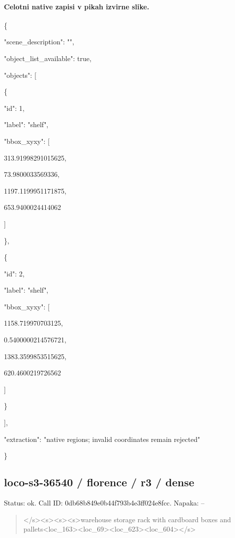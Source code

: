 \documentclass[10pt,a4paper]{article}
\begin{document}
\paragraph{Celotni native zapisi v pikah izvirne slike.}
\{\par
  "scene\_description":\allowbreak{} "",\allowbreak{}\par
  "object\_list\_available":\allowbreak{} true,\allowbreak{}\par
  "objects":\allowbreak{} [\par
    \{\par
      "id":\allowbreak{} 1,\allowbreak{}\par
      "label":\allowbreak{} "shelf",\allowbreak{}\par
      "bbox\_xyxy":\allowbreak{} [\par
        313.91998291015625,\allowbreak{}\par
        73.9800033569336,\allowbreak{}\par
        1197.1199951171875,\allowbreak{}\par
        653.9400024414062\par
      ]\par
    \},\allowbreak{}\par
    \{\par
      "id":\allowbreak{} 2,\allowbreak{}\par
      "label":\allowbreak{} "shelf",\allowbreak{}\par
      "bbox\_xyxy":\allowbreak{} [\par
        1158.719970703125,\allowbreak{}\par
        0.5400000214576721,\allowbreak{}\par
        1383.3599853515625,\allowbreak{}\par
        620.4600219726562\par
      ]\par
    \}\par
  ],\allowbreak{}\par
  "extraction":\allowbreak{} "native regions; invalid coordinates remain rejected"\par
\}
\subsection*{loco-s3-36540 / florence / r3 / dense}
Status: ok. Call ID: 0db68b849e0b44f793b4e3ff024e8fcc. Napaka: --
\begin{quote}\footnotesize
</s>\allowbreak{}<s>\allowbreak{}<s>\allowbreak{}<s>\allowbreak{}warehouse storage rack with cardboard boxes and pallets<loc\_163>\allowbreak{}<loc\_69>\allowbreak{}<loc\_623\allowbreak{}>\allowbreak{}<loc\_604>\allowbreak{}</s>\allowbreak{}
\end{quote}
\end{document}
